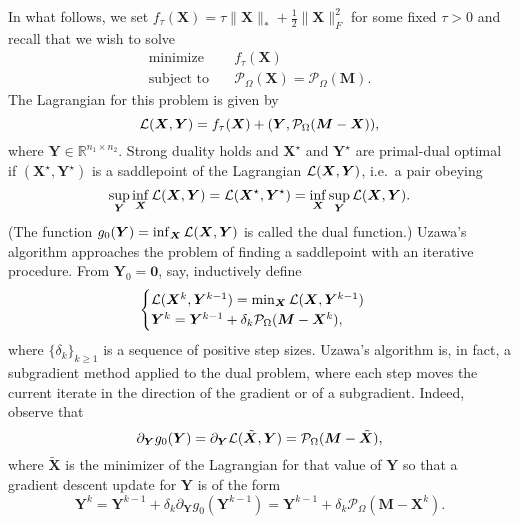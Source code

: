 \documentclass[conference,onecolumn,12pt]{IEEEtran}
\newcommand{\R}{\mathbb{R}}
\newcommand{\mtx}[1]{\bm{#1}}
\numberwithin{equation}{section}
\numberwithin{figure}{section}
\numberwithin{table}{section}
\theoremstyle{definition}
\begin{document}
In what follows, we set $f_\tau(\mtx{X}) = \tau \|\mtx{X}\|_* +
\frac{1}{2} \|\mtx{X}\|_F^2$ for some fixed $\tau > 0$ and recall that
we wish to solve
\[
  \begin{array}{ll}
    \textrm{minimize}   & \quad f_\tau(\mtx{X})\\
    \textrm{subject to} & \quad \mathcal{P}_\Omega(\mtx{X}) = \mathcal{P}_\Omega(\mtx{M}).
 \end{array}
\]
The Lagrangian for this problem is given by
\[
{\cal L}(\mtx{X},\mtx{Y}) = f_\tau(\mtx{X}) + (\mtx{Y}, {\cal
  P}_\Omega(\mtx{M} - \mtx{X})),
\]
where $\mtx{Y} \in \R^{n_1 \times n_2}$.  Strong duality holds and
$\mtx{X}^\star$ and $\mtx{Y}^\star$ are primal-dual optimal if
$(\mtx{X}^\star, \mtx{Y}^\star)$ is a saddlepoint of the Lagrangian
${\cal L}(\mtx{X},\mtx{Y})$, i.e.~a pair obeying
\begin{equation}
\label{eq:saddlepoint}
\sup_{\mtx{Y}} \inf_{\mtx{X}} {\cal L}(\mtx{X}, \mtx{Y}) = {\cal L}(\mtx{X}^\star, \mtx{Y}^\star) = \inf_{\mtx{X}} \sup_{\mtx{Y}}
{\cal L}(\mtx{X}, \mtx{Y}).
\end{equation}
(The function $g_0(\mtx{Y}) = \inf_{\mtx{X}} {\cal L}(\mtx{X},
\mtx{Y})$ is called the dual function.) Uzawa's algorithm approaches the
problem of finding a saddlepoint with an iterative procedure.  From
$\mtx{Y}_0 = \mtx{0}$, say, inductively define
\begin{equation}
\label{eq:Lag1}
\begin{cases}
{\cal L}(\mtx{X}^{k}, \mtx{Y}^{k-1})
 = \min_{\mtx{X}} {\cal L}(\mtx{X},\mtx{Y}^{k-1})\\  \mtx{Y}^k
 = \mtx{Y}^{k-1} + \delta_k \mathcal{P}_\Omega(\mtx{M} -\mtx{X}^k),
\end{cases}
\end{equation}
where $\{\delta_k\}_{k \ge 1}$ is a sequence of positive step
sizes. Uzawa's algorithm is, in fact, a subgradient method applied to
the dual problem, where each step moves the current iterate in the
direction of the gradient or of a subgradient. Indeed, observe that
\begin{equation}\label{eqn:partialg0}
\partial_{\mtx{Y}} g_0(\mtx{Y}) = \partial_{\mtx{Y}} {\cal
  L}(\tilde{\mtx{X}}, \mtx{Y}) =
\mathcal{P}_\Omega(\mtx{M}-\tilde{\mtx{X}}),
\end{equation}
where $\tilde{\mtx{X}}$ is the minimizer of the Lagrangian for that
value of $\mtx{Y}$ so that a gradient descent update for $\mtx{Y}$ is
of the form
\[
\mtx{Y}^k = \mtx{Y}^{k-1} + \delta_k \partial_{\mtx{Y}}
g_0(\mtx{Y}^{k-1}) = \mtx{Y}^{k-1} + \delta_k
\mathcal{P}_\Omega(\mtx{M}-\mtx{X}^k).
\]
\end{document}
